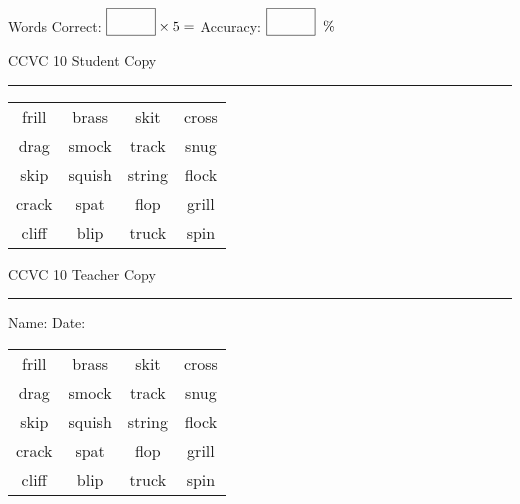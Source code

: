 \documentclass{memoir}
\begin{document}
\normalsize

Words Correct: $\fbox{\phantom{\huge 100}} \times 5 = $ Accuracy: $\fbox{\phantom{\huge 100}}\;\; \%$ 

\vfill

\newpage


\footnotesize \noindent
CCVC 10 \hfill Student Copy
\smallskip
\hrule

\Large

\setlength{\tabcolsep}{14pt}
\def\arraystretch{3}

{\selectfont


\begin{vplace}[0.5]
\begin{center}
\begin{tabular}{cccc}
frill & brass       & skit & cross \\
drag        & smock & track       & snug \\
skip & squish & string & flock \\
crack       & spat            & flop & grill            \\
cliff            & blip & truck & spin \\
\end{tabular}
\end{center}
\end{vplace}

}

\newpage

\footnotesize \noindent
CCVC 10 \hfill Teacher Copy
\smallskip
\hrule

\normalsize

\vfill

\noindent
Name: \underline{\hspace{1.75in}} \hfill Date: \underline{\hspace{1in}}

\Large

{\selectfont


\begin{vplace}[0.5]
\begin{center}
\begin{tabular}{cccc}
frill & brass       & skit & cross \\
drag        & smock & track       & snug \\
skip & squish & string & flock \\
crack       & spat            & flop & grill            \\
cliff            & blip & truck & spin \\
\end{tabular}
\end{center}
\end{vplace}



}
\end{document}
